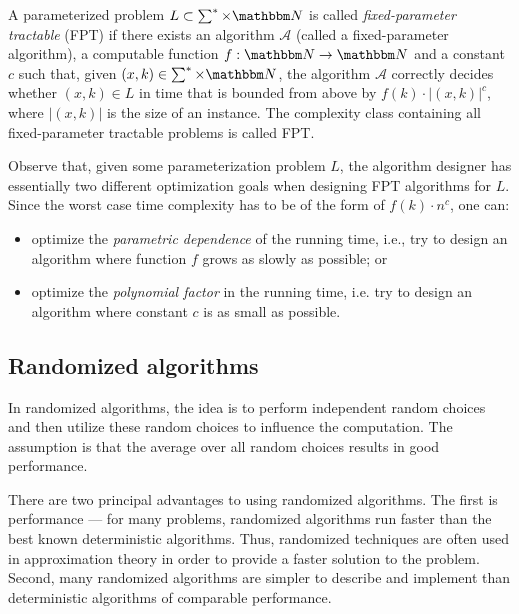 \begin{definition}
 A parameterized problem $L \subset \sum^* \times \N$ is called \textit{fixed-parameter tractable} (FPT) if there exists an algorithm $\mathcal{A}$ (called a fixed-parameter algorithm),
 a computable function $f: \N \rightarrow \N$ and a constant $c$ such that, given $(x,k) \in \sum^* \times \N$, the algorithm $\mathcal{A}$ correctly decides
 whether $(x,k) \in L$ in time that is bounded from above by $f(k) \cdot |(x,k)|^c$, where $|(x,k)|$ is the size of an instance.
 The complexity class containing all fixed-parameter tractable problems is called FPT.
\end{definition}

Observe that, given some parameterization problem $L$, the algorithm designer has essentially two different optimization goals when designing FPT algorithms for $L$.
Since the worst case time complexity has to be of the form of $f(k)\cdot n^c$, one can:
\begin{itemize}
 \item optimize the \textit{parametric dependence} of the running time, i.e., try to design an algorithm where function $f$ grows as slowly as possible; or
 \item optimize the \textit{polynomial factor} in the running time, i.e. try to design an algorithm where constant $c$ is as small as possible.
\end{itemize}

\subsection{Randomized algorithms}
In randomized algorithms, the idea is to perform independent random choices and then utilize these random choices to influence the computation.
The assumption is that the average over all random choices results in good performance.

There are two principal advantages to using randomized algorithms. The first is performance --- for many problems, 
randomized algorithms run faster than the best known deterministic algorithms.
Thus, randomized techniques are often used in approximation theory in order to provide a faster solution to the problem.
Second, many randomized algorithms are simpler to describe and implement than deterministic algorithms of
comparable performance. 

